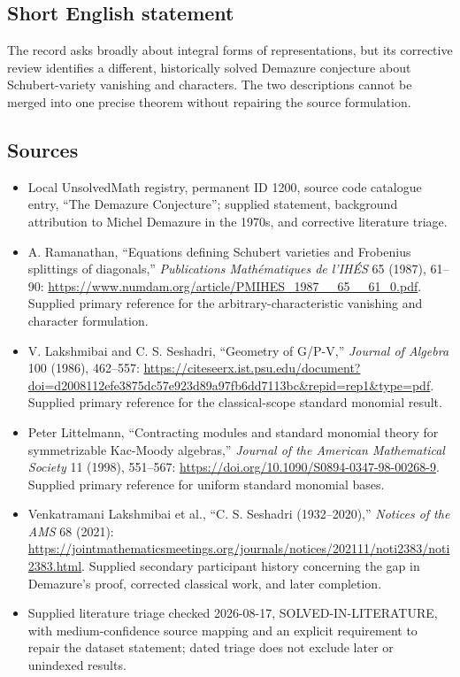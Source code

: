 \documentclass[11pt]{article}
\begin{document}
\subsection{Short English statement}
The record asks broadly about integral forms of representations, but its corrective review identifies a different, historically solved Demazure conjecture about Schubert-variety vanishing and characters. The two descriptions cannot be merged into one precise theorem without repairing the source formulation.
\subsection{Sources}
\begin{itemize}
\item Local UnsolvedMath registry, permanent ID 1200, source code catalogue entry, ``The Demazure Conjecture''; supplied statement, background attribution to Michel Demazure in the 1970s, and corrective literature triage.
\item A. Ramanathan, ``Equations defining Schubert varieties and Frobenius splittings of diagonals,'' \emph{Publications Math\'ematiques de l'IH\'ES} 65 (1987), 61--90: \url{https://www.numdam.org/article/PMIHES_1987__65__61_0.pdf}. Supplied primary reference for the arbitrary-characteristic vanishing and character formulation.
\item V. Lakshmibai and C. S. Seshadri, ``Geometry of G/P-V,'' \emph{Journal of Algebra} 100 (1986), 462--557: \url{https://citeseerx.ist.psu.edu/document?doi=d2008112efe3875dc57e923d89a97fb6dd7113bc&repid=rep1&type=pdf}. Supplied primary reference for the classical-scope standard monomial result.
\item Peter Littelmann, ``Contracting modules and standard monomial theory for symmetrizable Kac-Moody algebras,'' \emph{Journal of the American Mathematical Society} 11 (1998), 551--567: \url{https://doi.org/10.1090/S0894-0347-98-00268-9}. Supplied primary reference for uniform standard monomial bases.
\item Venkatramani Lakshmibai et al., ``C. S. Seshadri (1932--2020),'' \emph{Notices of the AMS} 68 (2021): \url{https://jointmathematicsmeetings.org/journals/notices/202111/noti2383/noti2383.html}. Supplied secondary participant history concerning the gap in Demazure's proof, corrected classical work, and later completion.
\item Supplied literature triage checked 2026-08-17, SOLVED-IN-LITERATURE, with medium-confidence source mapping and an explicit requirement to repair the dataset statement; dated triage does not exclude later or unindexed results.
\end{itemize}
\end{document}
